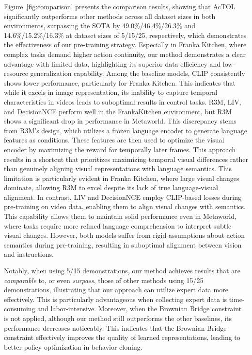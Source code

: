 Figure~\ref{fig:comparison} presents the comparison results, showing that AcTOL significantly outperforms other methods across all dataset sizes in both environments, surpassing the SOTA by 49.0\%/46.4\%/26.3\% and 14.6\%/15.2\%/16.3\% at dataset sizes of 5/15/25, respectively, which demonstrates the effectiveness of our pre-training strategy. Especially in Franka Kitchen, where complex tasks demand higher action continuity, our method demonstrates a clear advantage with limited data, highlighting its superior data efficiency and low-resource generalization capability. Among the baseline models, CLIP consistently shows lower performance, particularly for Franka Kitchen. This indicates that while it excels in image representation, its inability to capture temporal characteristics in videos leads to suboptimal results in control tasks. R3M, LIV, and DecisionNCE perform well in the FrankaKitchen environment, but R3M shows a significant drop in performance in Metaworld. This discrepancy stems from R3M's design, which utilizes a frozen language encoder to generate language features as conditions. These features are then used to optimize the visual encoder by maximizing the reward for temporally later frames. This approach results in a shortcut that prioritizes maximizing temporal visual differences rather than genuinely aligning visual representations with language semantics. This limitation is particularly evident in Franka Kitchen, where large visual changes dominate, allowing R3M to excel despite its lack of true language-visual alignment. In contrast, LIV and DecisionNCE employ CLIP-based losses during pre-training on video data, enabling them to align visual changes with semantics. This capability allows them to maintain solid performance even in Metaworld, where tasks require more refined language comprehension to interpret subtle visual changes. However, both models suffer from rigid assumptions about action semantics during pre-training, resulting in suboptimal alignment between vision and instructions.

Notably, when using 5/15 demonstrations, our method achieves results that are \textit{comparable} to, or even \textit{surpass}, those of other methods using 15/25 demonstrations, illustrating that our approach can utilize expert data more effectively. This is particularly advantageous when collecting expert data is time-consuming and labor-intensive. Moreover, when the Brownian Bridge constraint is not applied, although our method still outperforms the other baselines, its performance decreases noticeably. This indicates that the Brownian Bridge constraint effectively improves the quality of learned representations, leading to better policy optimization in behavior cloning.


